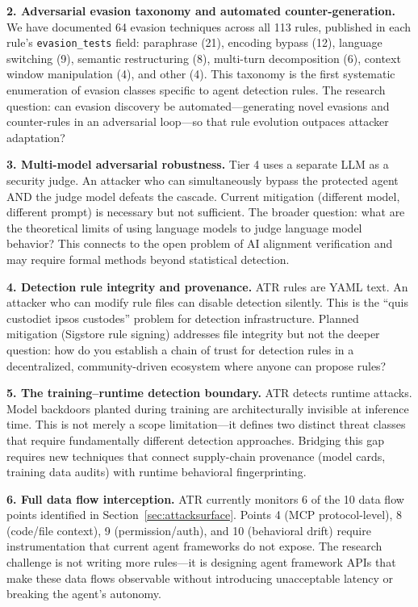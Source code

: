\documentclass[11pt,letterpaper]{article}
\begin{document}
\textbf{2. Adversarial evasion taxonomy and automated counter-generation.} We have documented 64 evasion techniques across all 113 rules, published in each rule's \texttt{evasion\_tests} field: paraphrase (21), encoding bypass (12), language switching (9), semantic restructuring (8), multi-turn decomposition (6), context window manipulation (4), and other (4). This taxonomy is the first systematic enumeration of evasion classes specific to agent detection rules. The research question: can evasion discovery be automated---generating novel evasions and counter-rules in an adversarial loop---so that rule evolution outpaces attacker adaptation?

\textbf{3. Multi-model adversarial robustness.} Tier 4 uses a separate LLM as a security judge. An attacker who can simultaneously bypass the protected agent AND the judge model defeats the cascade. Current mitigation (different model, different prompt) is necessary but not sufficient. The broader question: what are the theoretical limits of using language models to judge language model behavior? This connects to the open problem of AI alignment verification and may require formal methods beyond statistical detection.

\textbf{4. Detection rule integrity and provenance.} ATR rules are YAML text. An attacker who can modify rule files can disable detection silently. This is the ``quis custodiet ipsos custodes'' problem for detection infrastructure. Planned mitigation (Sigstore rule signing) addresses file integrity but not the deeper question: how do you establish a chain of trust for detection rules in a decentralized, community-driven ecosystem where anyone can propose rules?

\textbf{5. The training--runtime detection boundary.} ATR detects runtime attacks. Model backdoors planted during training are architecturally invisible at inference time. This is not merely a scope limitation---it defines two distinct threat classes that require fundamentally different detection approaches. Bridging this gap requires new techniques that connect supply-chain provenance (model cards, training data audits) with runtime behavioral fingerprinting.

\textbf{6. Full data flow interception.} ATR currently monitors 6 of the 10 data flow points identified in Section~\ref{sec:attacksurface}. Points 4 (MCP protocol-level), 8 (code/file context), 9 (permission/auth), and 10 (behavioral drift) require instrumentation that current agent frameworks do not expose. The research challenge is not writing more rules---it is designing agent framework APIs that make these data flows observable without introducing unacceptable latency or breaking the agent's autonomy.
\end{document}
